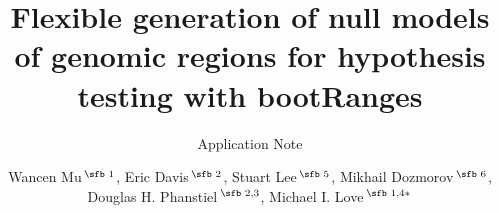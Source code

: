 \documentclass{bioinfo}
\begin{document}

\subtitle{Application Note}

\title[short Title]{Flexible generation of null models of genomic regions for hypothesis testing with bootRanges}
\author[Sample \textit{et~al}.]{Wancen Mu\,$^{\text{\sfb 1}}$, Eric Davis\,$^{\text{\sfb 2}}$, Stuart Lee\,$^{\text{\sfb 5}}$, Mikhail Dozmorov\,$^{\text{\sfb 6}}$, Douglas H. Phanstiel\,$^{\text{\sfb 2,3}}$, Michael I. Love\,$^{\text{\sfb 1,4}*}$}
\address{$^{\text{\sf 1}}$Department of Biostatistics, $^{\text{\sf 2}}$Curriculum in Bioinformatics and Computational Biology, $^{\text{\sf 3}}$Thurston Arthritis Research Center, Department of Cell Biology \& Physiology, Lineberger Comprehensive Cancer Center, Curriculum in Genetics \& Molecular Biology, and $^{\text{\sf 4}}$ Department of Genetics, University of North Carolina-Chapel Hill, NC 27599
$^{\text{\sf 5}}$Genentech, South San Francisco, CA, USA $^{\text{\sf 6}}$Department of Biostatistics, Department of Pathology, Virginia Commonwealth University, Richmond, VA 23298.\\}





\maketitle
{}





%
%
%
%
%
%
%

\end{document}
